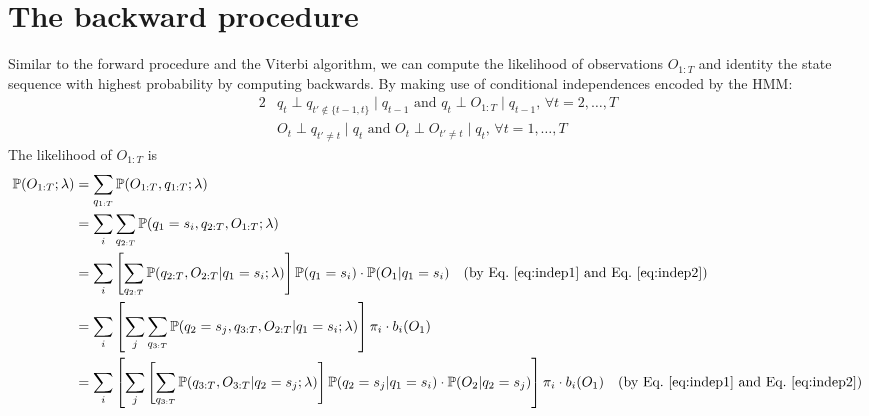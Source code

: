 \section{The backward procedure}
\label{sec:backward}

Similar to the forward procedure and the Viterbi algorithm, 
we can compute the likelihood of observations $O_{1:T}$ and identity the state sequence with highest probability by computing backwards.
By making use of conditional independences encoded by the HMM:
\begin{alignat}{2}
& q_t \perp q_{t' \notin \{t-1,t\}} \mid q_{t-1} \text{~and~} q_t \perp O_{1:T} \mid q_{t-1}, \, \forall t=2,\dots,T  \label{eq:indep1} \\
& O_t \perp q_{t' \ne t} \mid q_t \text{~and~} O_t \perp O_{t' \ne t} \mid q_t, \, \forall t=1,\dots,T                \label{eq:indep2}
\end{alignat}
The likelihood of $O_{1:T}$ is 
\begin{align*}
\mathbb{P}(O_{1:T} ;\lambda) 
&= \sum_{q_{1:T}} \mathbb{P}(O_{1:T},q_{1:T} ;\lambda) \\
&= \sum_{i} \sum_{q_{2:T}} \mathbb{P}(q_1 = s_i, q_{2:T}, O_{1:T} ;\lambda) \\
&= \sum_{i} \left[ \sum_{q_{2:T}} \mathbb{P}(q_{2:T}, O_{2:T} |q_1 = s_i; \lambda) \right] \mathbb{P}(q_1 = s_i) \cdot \mathbb{P}(O_1 |q_1 = s_i) 
   ~~~ \text{(by Eq.~\ref{eq:indep1} and Eq.~\ref{eq:indep2})} \\
&= \sum_{i} \left[ \sum_{j} \sum_{q_{3:T}} \mathbb{P}(q_2 = s_j, q_{3:T}, O_{2:T} |q_1 = s_i; \lambda) \right] \pi_i \cdot b_i(O_1) \\
&= \sum_{i} \left[ \sum_{j} \left[ \sum_{q_{3:T}} \mathbb{P}(q_{3:T}, O_{3:T} |q_2 = s_j; \lambda) \right] \mathbb{P}(q_2 = s_j |q_1 = s_i) \cdot \mathbb{P}(O_2 |q_2 = s_j) 
   \right] \pi_i \cdot b_i(O_1) 
   ~~~ \text{(by Eq.~\ref{eq:indep1} and Eq.~\ref{eq:indep2})}
\end{align*}


